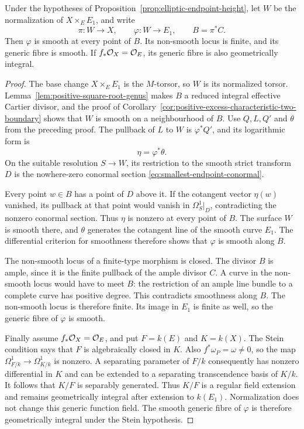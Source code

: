 \begin{proposition}
\label{prop:elliptic-endpoint-smoothing}
Under the hypotheses of Proposition~\ref{prop:elliptic-endpoint-height},
let $W$ be the normalization of $X\times_E E_1$, and write
\[
 \pi:W\longrightarrow X,\qquad
 \varphi:W\longrightarrow E_1,\qquad B=\pi^*C.
\]
Then $\varphi$ is smooth at every point of $B$.
Its non-smooth locus is finite, and its generic fibre is smooth.
If $f_*\mathcal O_X=\mathcal O_E$, its generic fibre is also geometrically integral.
\end{proposition}

\begin{proof}
The base change $X\times_E E_1$ is the $M$-torsor, so $W$ is its
normalized torsor.  Lemma~\ref{lem:positive-square-root-genus}
makes $B$ a reduced integral effective Cartier divisor, and the proof
of Corollary~\ref{cor:positive-excess-characteristic-two-boundary}
shows that $W$ is smooth on a neighbourhood of $B$.
Use $Q,L,Q'$ and $\theta$ from the preceding proof.
The pullback of $L$ to $W$ is $\varphi^*Q'$, and its logarithmic
form is
\[
 \eta=\varphi^*\theta.
\]
On the suitable resolution $S\to W$, its restriction to the smooth
strict transform $D$ is the nowhere-zero conormal section
\eqref{eq:smallest-endpoint-conormal}.

Every point $w\in B$ has a point of $D$ above it.
If the cotangent vector $\eta(w)$ vanished, its pullback at that
point would vanish in $\Omega_S^1|_D$, contradicting the nonzero
conormal section.  Thus $\eta$ is nonzero at every point of $B$.
The surface $W$ is smooth there, and $\theta$ generates the
cotangent line of the smooth curve $E_1$.
The differential criterion for smoothness therefore shows that
$\varphi$ is smooth along $B$.

The non-smooth locus of a finite-type morphism is closed.
The divisor $B$ is ample, since it is the finite pullback of the
ample divisor $C$.  A curve in the non-smooth locus would have to
meet $B$: the restriction of an ample line bundle to a complete
curve has positive degree.  This contradicts smoothness along $B$.
The non-smooth locus is therefore finite.  Its image in $E_1$ is
finite as well, so the generic fibre of $\varphi$ is smooth.

Finally assume $f_*\mathcal O_X=\mathcal O_E$, and put $F=k(E)$ and $K=k(X)$.
The Stein condition says that $F$ is algebraically closed in $K$.
Also $f^*\omega_P=\omega\ne0$, so the map
$\Omega^1_{F/k}\to\Omega^1_{K/k}$ is nonzero.
A separating parameter of $F/k$ consequently has nonzero
differential in $K$ and can be extended to a separating
transcendence basis of $K/k$.  It follows that $K/F$ is separably
generated.  Thus $K/F$ is a regular field extension and remains
geometrically integral after extension to $k(E_1)$.
Normalization does not change this generic function field.
The smooth generic fibre of $\varphi$ is therefore geometrically
integral under the Stein hypothesis.
\end{proof}

